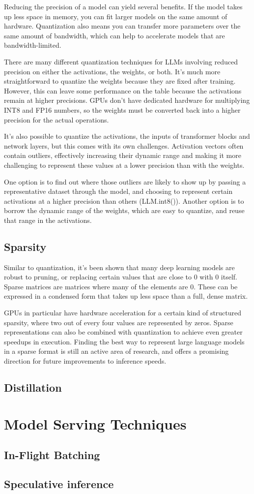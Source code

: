 Reducing the precision of a model can yield several benefits. If the model takes up less space in memory, you can fit larger models on the same amount of hardware. Quantization also means you can transfer more parameters over the same amount of bandwidth, which can help to accelerate models that are bandwidth-limited. 

There are many different quantization techniques for LLMs involving reduced precision on either the activations, the weights, or both. It's much more straightforward to quantize the weights because they are fixed after training. However, this can leave some performance on the table because the activations remain at higher precisions. GPUs don't have dedicated hardware for multiplying INT8 and FP16 numbers, so the weights must be converted back into a higher precision for the actual operations. 

It's also possible to quantize the activations, the inputs of transformer blocks and network layers, but this comes with its own challenges. Activation vectors often contain outliers, effectively increasing their dynamic range and making it more challenging to represent these values at a lower precision than with the weights. 

One option is to find out where those outliers are likely to show up by passing a representative dataset through the model, and choosing to represent certain activations at a higher precision than others (LLM.int8()). Another option is to borrow the dynamic range of the weights, which are easy to quantize, and reuse that range in the activations.

\subsection{Sparsity}

Similar to quantization, it's been shown that many deep learning models are robust to pruning, or replacing certain values that are close to 0 with 0 itself. Sparse matrices are matrices where many of the elements are 0. These can be expressed in a condensed form that takes up less space than a full, dense matrix.

GPUs in particular have hardware acceleration for a certain kind of structured sparsity, where two out of every four values are represented by zeros. Sparse representations can also be combined with quantization to achieve even greater speedups in execution. Finding the best way to represent large language models in a sparse format is still an active area of research, and offers a promising direction for future improvements to inference speeds.

\subsection{Distillation}


\section{Model Serving Techniques}

\subsection{In-Flight Batching}
\subsection{Speculative inference}
